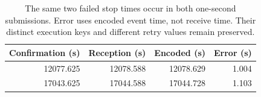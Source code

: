 \begin{table}[!htbp]
\centering\small
\caption{The same two failed stop times occur in both one-second submissions. Error uses encoded event time, not receive time. Their distinct execution keys and different retry values remain preserved.}
\label{tab:timing}
\begin{tabular}{@{}rrrr@{}}\toprule
Confirmation (s) & Reception (s) & Encoded (s) & Error (s) \\\midrule
12077.625 & 12078.588 & 12078.629 & 1.004 \\
17043.625 & 17044.588 & 17044.728 & 1.103 \\
\bottomrule\end{tabular}
\end{table}
